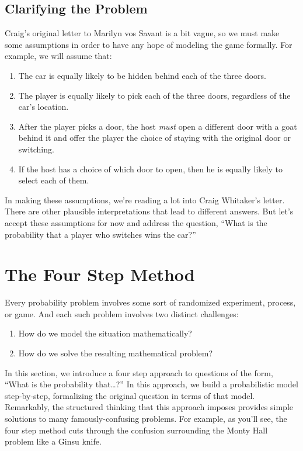 \subsection{Clarifying the Problem}

Craig's original letter to Marilyn vos Savant is a bit vague, so we
must make some assumptions in order to have any hope of modeling the
game formally.  For example, we will assume that:
\begin{enumerate}

\item The car is equally likely to be hidden behind each of the three
doors.

\item The player is equally likely to pick each of the three doors,
regardless of the car's location.

\item After the player picks a door, the host \emph{must} open a
different door with a goat behind it and offer the player the choice
of staying with the original door or switching.

\item If the host has a choice of which door to open, then he is
equally likely to select each of them.

\end{enumerate}
In making these assumptions, we're reading a lot into Craig
Whitaker's letter.  There are other plausible interpretations that
lead to different answers.  But let's accept these assumptions for now
and address the question, ``What is the probability that a player who
switches wins the car?''

\section{The Four Step Method}\label{4step_sec}

Every probability problem involves some sort of randomized experiment,
process, or game.  And each such problem involves two distinct
challenges:
%
\begin{enumerate}
\item How do we model the situation mathematically?
\item How do we solve the resulting mathematical problem?
\end{enumerate}
%
In this section, we introduce a four step approach to questions of the
form, ``What is the probability that\dots ?''  In this approach, we build
a probabilistic model step-by-step, formalizing the original question in
terms of that model.  Remarkably, the structured thinking that this
approach imposes provides simple solutions to many famously-confusing
problems.  For example, as you'll see, the four step method cuts through
the confusion surrounding the Monty Hall problem like a Ginsu knife.

